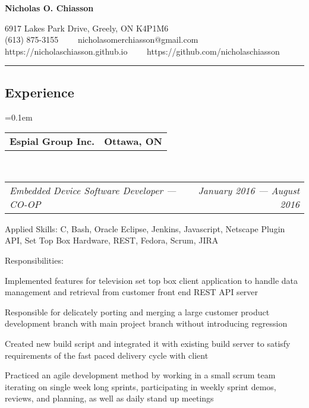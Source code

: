 \documentclass[10pt,letterpaper]{article}
\makeatletter
\newenvironment{indentsection}[1]%
{\begin{list}{}%
  {\setlength{\leftmargin}{#1}}%
  \item[]%
}
{\end{list}}
\newcommand{\headerrow}[2]
{\begin{tabular*}{\linewidth}{l@{\extracolsep{\fill}}r}
  #1 &
  #2 \\
\end{tabular*}}
\newcommand{\formalname}
{Nicholas O. Chiasson}
\makeatother
\begin{document}
\begin{center}
{\LARGE \textbf{\formalname}}

6917 Lakes Park Drive, Greely, ON K4P1M6
\\
(613) 875-3155\ \ \textbullet
\ \ nicholasomerchiasson@gmail.com
\\
https://nicholaschiasson.github.io\ \ \textbullet
\ \ https://github.com/nicholaschiasson
\end{center}

\hrule
\vspace{-0.4em}
\subsection*{Experience}

\begin{itemize}
  \parskip=0.1em

  \item
  \headerrow
    {\textbf{Espial Group Inc.}}
    {\textbf{Ottawa, ON}}
  \\
  \headerrow
    {\emph{Embedded Device Software Developer — CO-OP}}
    {\emph{January 2016 — August 2016}}
  \begin{indentsection}{1em}
    \begin{description*}
      \item[Applied Skills:]
      C, Bash, Oracle Eclipse, Jenkins, Javascript, Netscape Plugin API, Set Top
      Box Hardware, REST, Fedora, Scrum, JIRA
      \item[Responsibilities:]
      \hfill
      \begin{itemize*}
        \item Implemented features for television set top box client application
        to handle data management and retrieval from customer front end REST API
        server
        \item Responsible for delicately porting and merging a large customer
        product development branch with main project branch without introducing
        regression
        \item Created new build script and integrated it with existing build
        server to satisfy requirements of the fast paced delivery cycle with
        client
        \item Practiced an agile development method by working in a small scrum
        team iterating on single week long sprints, participating in weekly sprint
        demos, reviews, and planning, as well as daily stand up meetings
      \end{itemize*}
    \end{description*}
  \end{indentsection}


\end{itemize}
\end{document}
